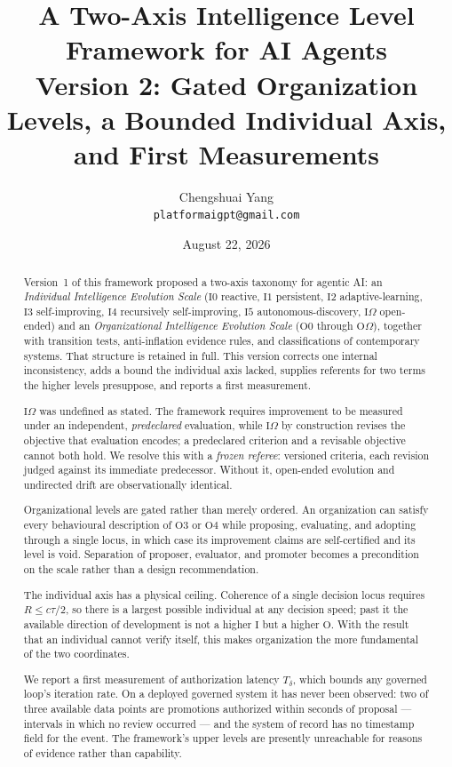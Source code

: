 \documentclass[11pt]{article}
\title{\LARGE A Two-Axis Intelligence Level Framework for AI Agents\\[6pt]
\large Version 2: Gated Organization Levels, a Bounded Individual Axis,\\
and First Measurements}
\author{Chengshuai Yang\\
\small\texttt{platformaigpt@gmail.com}}
\date{August 22, 2026}
\newcommand{\Ilev}[1]{\ensuremath{\mathrm{I}#1}}
\newcommand{\Olev}[1]{\ensuremath{\mathrm{O}#1}}
\newcommand{\IOm}{\ensuremath{\mathrm{I}\Omega}}
\newcommand{\OOm}{\ensuremath{\mathrm{O}\Omega}}
\newcommand{\Td}{\ensuremath{T_\delta}}
\begin{document}
\maketitle

\begin{abstract}
Version~1 of this framework proposed a two-axis taxonomy for agentic AI: an \emph{Individual Intelligence Evolution Scale} (\Ilev{0} reactive, \Ilev{1} persistent, \Ilev{2} adaptive-learning, \Ilev{3} self-improving, \Ilev{4} recursively self-improving, \Ilev{5} autonomous-discovery, \IOm{} open-ended) and an \emph{Organizational Intelligence Evolution Scale} (\Olev{0} through \OOm{}), together with transition tests, anti-inflation evidence rules, and classifications of contemporary systems. That structure is retained in full. This version corrects one internal inconsistency, adds a bound the individual axis lacked, supplies referents for two terms the higher levels presuppose, and reports a first measurement.

\IOm{} was undefined as stated. The framework requires improvement to be measured under an independent, \emph{predeclared} evaluation, while \IOm{} by construction revises the objective that evaluation encodes; a predeclared criterion and a revisable objective cannot both hold. We resolve this with a \emph{frozen referee}: versioned criteria, each revision judged against its immediate predecessor. Without it, open-ended evolution and undirected drift are observationally identical.

Organizational levels are gated rather than merely ordered. An organization can satisfy every behavioural description of \Olev{3} or \Olev{4} while proposing, evaluating, and adopting through a single locus, in which case its improvement claims are self-certified and its level is void. Separation of proposer, evaluator, and promoter becomes a precondition on the scale rather than a design recommendation.

The individual axis has a physical ceiling. Coherence of a single decision locus requires $R \le c\tau/2$, so there is a largest possible individual at any decision speed; past it the available direction of development is not a higher \Ilev{} but a higher \Olev{}. With the result that an individual cannot verify itself, this makes organization the more fundamental of the two coordinates.

We report a first measurement of authorization latency \Td{}, which bounds any governed loop's iteration rate. On a deployed governed system it has never been observed: two of three available data points are promotions authorized within seconds of proposal --- intervals in which no review occurred --- and the system of record has no timestamp field for the event. The framework's upper levels are presently unreachable for reasons of evidence rather than capability.
\end{abstract}
\end{document}
